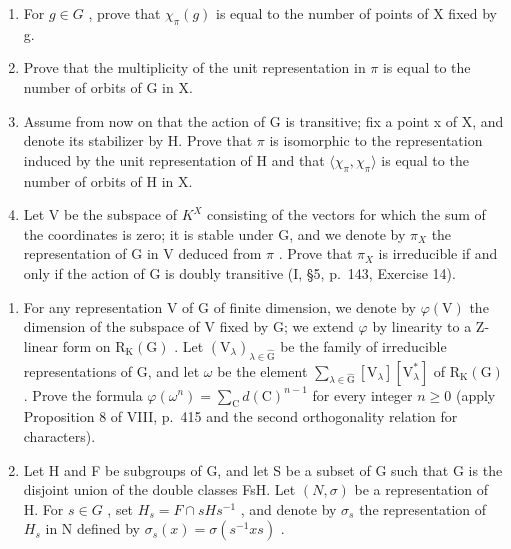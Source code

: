 \begin{enumerate}
\def\labelenumi{\alph{enumi})}
\item
  For \(g \in G\) , prove that \(\chi_{\pi}(g)\) is equal to the number of points of X fixed by g.
\item
  Prove that the multiplicity of the unit representation in \(\pi\) is equal to the number of orbits of G in X.
\item
  Assume from now on that the action of G is transitive; fix a point x of X, and denote its stabilizer by H. Prove that \(\pi\) is isomorphic to the representation induced by the unit representation of H and that \(\langle\chi_{\pi},\chi_{\pi}\rangle\) is equal to the number of orbits of H in X.
\item
  Let V be the subspace of \(K^{X}\) consisting of the vectors for which the sum of the coordinates is zero; it is stable under G, and we denote by \(\pi_{X}\) the representation of G in V deduced from \(\pi\) . Prove that \(\pi_{X}\) is irreducible if and only if the action of G is doubly transitive (I, §5, p.~143, Exercise 14).
\end{enumerate}

\begin{enumerate}
\def\labelenumi{\arabic{enumi})}
\setcounter{enumi}{6}
\item
  For any representation V of G of finite dimension, we denote by \(\varphi(\mathrm{V})\) the dimension of the subspace of V fixed by G; we extend \(\varphi\) by linearity to a Z-linear form on \(\mathrm{R}_{\mathrm{K}}(\mathrm{G})\) . Let \((\mathrm{V}_{\lambda})_{\lambda\in\widehat{\mathrm{G}}}\) be the family of irreducible representations of G, and let \(\omega\) be the element \(\sum_{\lambda\in\widehat{\mathrm{G}}}\left[\mathrm{V}_{\lambda}\right]\left[\mathrm{V}_{\lambda}^{*}\right]\) of \(\mathrm{R}_{\mathrm{K}}(\mathrm{G})\) . Prove the formula \(\varphi(\omega^{n})=\sum_{\mathrm{C}}d(\mathrm{C})^{n-1}\) for every integer \(n\geqslant0\) (apply Proposition 8 of VIII, p.~415 and the second orthogonality relation for characters).
\item
  Let H and F be subgroups of G, and let S be a subset of G such that G is the disjoint union of the double classes FsH. Let \((N,\sigma)\) be a representation of H. For \(s\in G\) , set \(H_{s}=F\cap sHs^{-1}\) , and denote by \(\sigma_{s}\) the representation of \(H_{s}\) in N defined by \(\sigma_{s}(x)=\sigma(s^{-1}xs)\) .
\end{enumerate}

